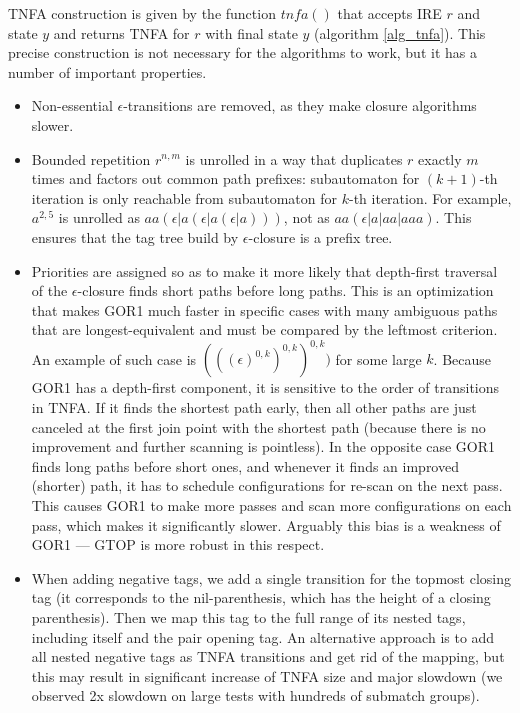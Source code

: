 \documentclass[AMA,STIX1COL]{WileyNJD-v2}
\begin{document}
TNFA construction is given by the function $tn\!f\!a()$
that accepts IRE $r$ and state $y$ and returns TNFA for $r$ with final state $y$
(algorithm \ref{alg_tnfa}).
%
This precise construction is not necessary for the algorithms to work,
but it has a number of important properties.
\begin{itemize}[itemsep=0.5em, topsep=0.5em]
    \item Non-essential $\epsilon$-transitions are removed, as they make closure algorithms slower.

    \item Bounded repetition $r^{n,m}$ is unrolled in a way
        that duplicates $r$ exactly $m$ times
        and factors out common path prefixes:
        subautomaton for $(k+1)$-th iteration is only reachable from subautomaton for $k$-th iteration.
        For example, $a^{2,5}$ is unrolled as $aa(\epsilon | a (\epsilon | a (\epsilon | a)))$, not as $aa(\epsilon|a|aa|aaa)$.
        This ensures that the tag tree build by $\epsilon$-closure is a prefix tree.

    \item Priorities are assigned so as to make it more likely
        that depth-first traversal of the $\epsilon$-closure finds short paths before long paths.
        This is an optimization that makes GOR1 much faster in specific cases
        with many ambiguous paths that are longest-equivalent and must be compared by the leftmost criterion.
        An example of such case is $(((\epsilon)^{0,k})^{0,k})^{0,k})$ for some large $k$.
        Because GOR1 has a depth-first component, it is sensitive to the order of transitions in TNFA.
        If it finds the shortest path early, then all other paths are just canceled at the first join point with the shortest path
        (because there is no improvement and further scanning is pointless).
        In the opposite case GOR1 finds long paths before short ones,
        and whenever it finds an improved (shorter) path, it has to schedule configurations for re-scan on the next pass.
        This causes GOR1 to make more passes and scan more configurations on each pass,
        which makes it significantly slower.
        Arguably this bias is a weakness of GOR1 --- GTOP is more robust in this respect.

    \item When adding negative tags, we add a single transition for the topmost closing tag
        (it corresponds to the nil-parenthesis, which has the height of a closing parenthesis).
        Then we map this tag to the full range of its nested tags, including itself and the pair opening tag.
        An alternative approach is to add all nested negative tags as TNFA transitions and get rid of the mapping,
        but this may result in significant increase of TNFA size and major slowdown
        (we observed 2x slowdown on large tests with hundreds of submatch groups).


\end{itemize}
\end{document}
